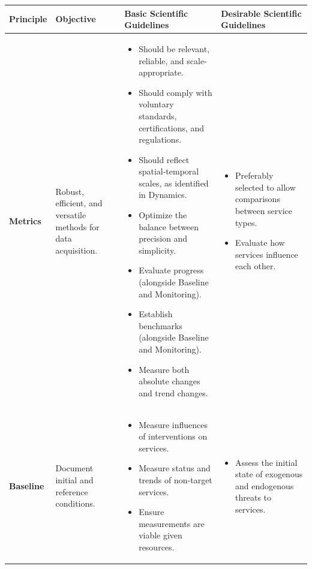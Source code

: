 \documentclass[./main_en.tex]{subfiles}
\begin{document}
{\renewcommand{\arraystretch}{1.5}
\begin{table}[t!]
    \centering	
    \tiny
    \sffamily
    \begin{tabular}{ 
         >{\raggedright\arraybackslash}m{1.5cm}  
         >{\raggedright\arraybackslash}m{2.2cm}  
         >{\raggedright\arraybackslash}m{4.6cm}
         >{\raggedright\arraybackslash}m{4.6cm}
    }
    \toprule 
\textbf{Principle} & \textbf{Objective} & \textbf{Basic Scientific Guidelines} & \textbf{Desirable Scientific Guidelines} \\
\midrule
\textbf{Metrics}& 
Robust, efficient, and versatile methods for data acquisition.
& \begin{itemize}
    \setlength{\itemsep}{-0.4em}
    \item Should be relevant, reliable, and scale-appropriate.
    \item Should comply with voluntary standards, certifications, and regulations.
    \item Should reflect spatial-temporal scales, as identified in Dynamics.
    \item Optimize the balance between precision and simplicity.
    \item Evaluate progress (alongside Baseline and Monitoring).
    \item Establish benchmarks (alongside Baseline and Monitoring).
    \item Measure both absolute changes and trend changes.
\end{itemize}
& \begin{itemize}
    \setlength{\itemsep}{-0.4em}
    \item Preferably selected to allow comparisons between service types.
    \item Evaluate how services influence each other.
\end{itemize} \\
\textbf{Baseline}
& Document initial and reference conditions. 
& \begin{itemize}
    \setlength{\itemsep}{-0.4em}
    \item Measure influences of interventions on services.
    \item Measure status and trends of non-target services.
    \item Ensure measurements are viable given resources.
\end{itemize}
& \begin{itemize}
    \setlength{\itemsep}{-0.4em}
    \item Assess the initial state of exogenous and endogenous threats to services.

\end{itemize}
\end{tabular}
\end{table}}
\end{document}
